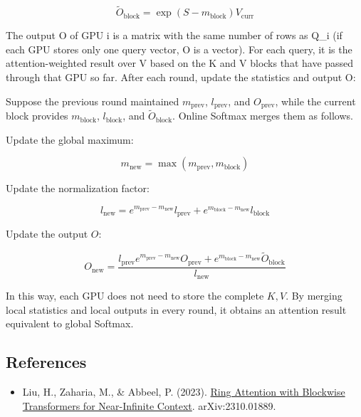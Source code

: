 \[
\tilde O_{\mathrm{block}} = \exp(S - m_{\mathrm{block}}) V_{\mathrm{curr}}
\]

The output O of GPU i is a matrix with the same number of rows as Q\_i (if each GPU stores only one query vector, O is a vector). For each query, it is the attention-weighted result over V based on the K and V blocks that have passed through that GPU so far. After each round, update the statistics and output O:

Suppose the previous round maintained \(m_{\mathrm{prev}}\), \(l_{\mathrm{prev}}\), and \(O_{\mathrm{prev}}\), while the current block provides \(m_{\mathrm{block}}\), \(l_{\mathrm{block}}\), and \(\tilde O_{\mathrm{block}}\). Online Softmax merges them as follows.

Update the global maximum:

\[
m_{\mathrm{new}} = \max(m_{\mathrm{prev}}, m_{\mathrm{block}})
\]

Update the normalization factor:

\[
l_{\mathrm{new}} =
e^{m_{\mathrm{prev}} - m_{\mathrm{new}}} l_{\mathrm{prev}}
+ e^{m_{\mathrm{block}} - m_{\mathrm{new}}} l_{\mathrm{block}}
\]

Update the output \(O\):

\[
O_{\mathrm{new}} =
\frac{
l_{\mathrm{prev}} e^{m_{\mathrm{prev}} - m_{\mathrm{new}}} O_{\mathrm{prev}}
+ e^{m_{\mathrm{block}} - m_{\mathrm{new}}} \tilde O_{\mathrm{block}}
}{
l_{\mathrm{new}}
}
\]

In this way, each GPU does not need to store the complete \(K, V\). By merging local statistics and local outputs in every round, it obtains an attention result equivalent to global Softmax.

\FloatBarrier
{}
\hypertarget{references-93}{%
\subsection{References}\label{references-93}}

\vspace{0.25em}
\begin{itemize}
\tightlist
\item
  Liu, H., Zaharia, M., \& Abbeel, P. (2023). \href{https://arxiv.org/abs/2310.01889}{Ring Attention with Blockwise Transformers for Near-Infinite Context}. arXiv:2310.01889.
\end{itemize}

\clearpage
